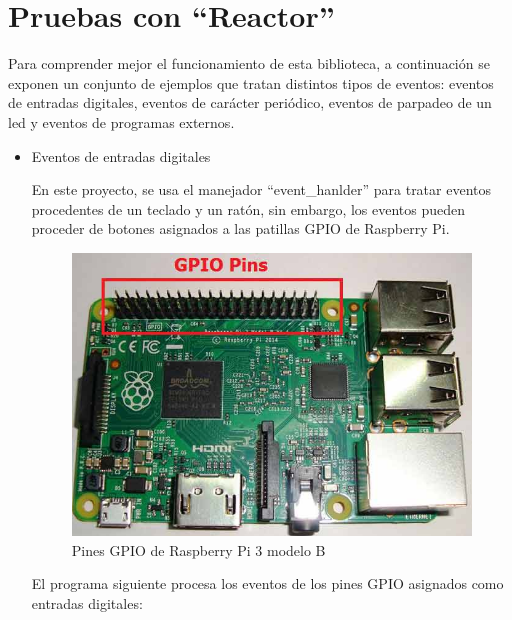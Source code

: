 \appendix
\chapter{Pruebas con ``Reactor''} \label{anexoA}
\newpage

Para comprender mejor el funcionamiento de esta biblioteca, a continuación se exponen un conjunto de ejemplos que tratan distintos tipos de eventos: eventos de entradas digitales, eventos de carácter periódico, eventos de parpadeo de un led y eventos de programas externos.

\begin{itemize}
    \item Eventos de entradas digitales
    
    En este proyecto, se usa el manejador ``event\_hanlder'' para tratar eventos procedentes de un teclado y un ratón, sin embargo, los eventos pueden proceder de botones asignados a las patillas GPIO de Raspberry Pi. 
    
    \begin{figure}[H]
    \centering
    \includegraphics[scale = 0.3]{anexo_a/figuras_dir/GPIO.jpg}
    \caption{Pines GPIO de Raspberry Pi 3 modelo B}
    \end{figure}
    
    El programa siguiente procesa los eventos de los pines GPIO asignados como entradas digitales:
    
\end{itemize}
